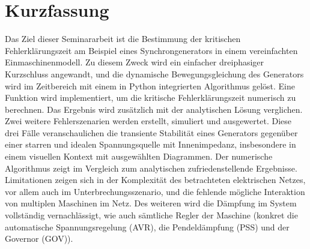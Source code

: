 \section*{Kurzfassung}

Das Ziel dieser Seminararbeit ist die Bestimmung der kritischen Fehlerklärungszeit am Beispiel eines Synchrongenerators in einem vereinfachten Einmaschinenmodell. Zu diesem Zweck wird ein einfacher dreiphasiger Kurzschluss angewandt, und die dynamische Bewegungsgleichung des Generators wird im Zeitbereich mit einem in Python integrierten Algorithmus gelöst. Eine Funktion wird implementiert, um die kritische Fehlerklärungszeit numerisch zu berechnen. Das Ergebnis wird zusätzlich mit der analytischen Lösung verglichen. Zwei weitere Fehlerszenarien werden erstellt, simuliert und
ausgewertet. Diese drei Fälle veranschaulichen die transiente Stabilität eines Generators gegenüber einer starren und idealen Spannungsquelle mit Innenimpedanz, insbesondere in einem visuellen Kontext mit ausgewählten Diagrammen. Der numerische Algorithmus zeigt im Vergleich zum analytischen zufriedenstellende Ergebnisse. Limitationen zeigen sich in der Komplexität des betrachteten elektrischen Netzes, vor allem auch im Unterbrechungsszenario, und die fehlende mögliche Interaktion von multiplen Maschinen im Netz. Des weiteren wird die Dämpfung im System vollständig vernachlässigt, wie auch sämtliche Regler der Maschine (konkret die automatische Spannungsregelung (AVR), die Pendeldämpfung (PSS) und der Governor (GOV)).

